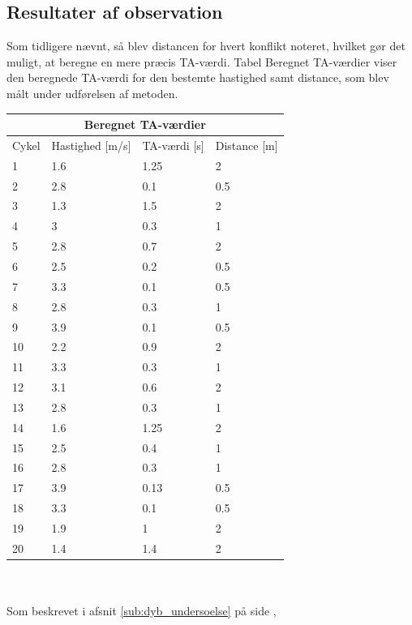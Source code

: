 \subsection{Resultater af observation}
\label{sub:resul_obs}
Som tidligere nævnt, så blev distancen for hvert konflikt noteret, hvilket gør det muligt, at beregne en mere præcis TA-værdi. Tabel Beregnet TA-værdier viser den beregnede TA-værdi for den bestemte hastighed samt distance, som blev målt under udførelsen af metoden.
\\
\begin{tabular}{ |p{1cm}|p{4cm}|p{4cm}|p{4cm}|  }
\hline
\multicolumn{4}{|c|}{Beregnet TA-værdier} \\
\hline
Cykel & Hastighed [m/s] & TA-værdi [s] & Distance [m] \\
\hline
1 & 1.6   & 1.25 & 2 \\
2 & 2.8 & 0.1 & 0.5 \\
3 & 1.3 & 1.5 & 2 \\
4 & 3  & 0.3 & 1 \\
5 & 2.8  & 0.7 & 2 \\
6 & 2.5   & 0.2 & 0.5 \\
7 & 3.3  & 0.1 & 0.5 \\
8 & 2.8  & 0.3 & 1 \\
9 & 3.9  & 0.1 & 0.5\\
10 & 2.2  & 0.9   & 2 \\
11 & 3.3 & 0.3 &  1 \\
12 & 3.1 & 0.6 &   2\\
13 & 2.8 & 0.3 & 1\\
14 & 1.6  & 1.25   & 2\\
15 & 2.5  & 0.4 & 1\\
16 & 2.8 & 0.3 & 1\\
17 & 3.9 & 0.13 &0.5\\
18 & 3.3 & 0.1 & 0.5\\
19 & 1.9  & 1 & 2\\
20 & 1.4  & 1.4 & 2\\
\hline
\end{tabular}
\\\\
Som beskrevet i afsnit \cref{sub:dyb_undersoelse} på side \pageref{sub:dyb_undersoelse} ,
